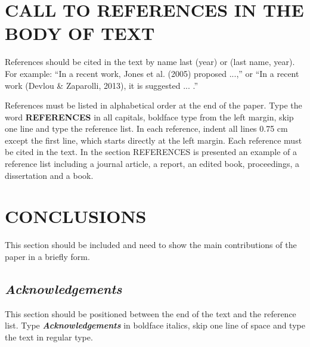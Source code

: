 \documentclass[12pt,fleqn]{article}
\begin{document}
\section{CALL TO REFERENCES IN THE BODY OF TEXT}
References should be cited in the text by name last (year) or (last name,
year). For example: ``In a recent work, Jones et al. (2005) proposed ...,'' or
``In a recent work (Devlou \& Zaparolli, 2013), it is suggested ... .''

References must be listed in alphabetical order at the end of the paper. Type
the word \textbf{REFERENCES} in all capitals, boldface type from the left
margin, skip one line and type the reference list. In each reference, indent
all lines 0.75 cm except the first line, which starts directly at the left
margin. Each reference must be cited in the text. In the section REFERENCES is
presented an example of a reference list including a journal article, a report,
an edited book, proceedings, a dissertation and a book.

\section{CONCLUSIONS}
This section should be included and need to show the main contributions of the
paper in a briefly form.

\subsection*{\textit{Acknowledgements}}
This section should be positioned between the end of the text and the reference
list. Type \textbf{\textit{Acknowledgements}} in boldface italics, skip one
line of space and type the text in regular type.
\end{document}

